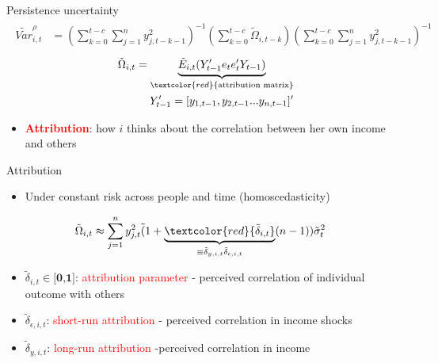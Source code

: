 \documentclass{beamer}
\begin{document}
\begin{frame}{Persistence uncertainty}
	\begin{eqnarray}
	\begin{split}
	\tilde {Var}^{\rho}_{i,t} & =   (\sum^{t-c}_{k=0}\sum^{n}_{j=1}y^2_{j,t-k-1})^{-1}(\sum^{t-c}_{k=0}\tilde \Omega_{i,t-k})(\sum^{t-c}_{k=0}\sum^{n}_{j=1}y^2_{j,t-k-1})^{-1}
	\end{split}
	\end{eqnarray}
	\begin{eqnarray}
	\begin{split}
	\tilde \Omega_{i,t} = \underbrace{\tilde E_{i,t}(Y'_{t-1}e_{t}e_{t}'Y_{t-1})}_{\textcolor{red}{\text{attribution matrix}}} \\
	Y'_{t-1} = [y_{1,t-1},y_{2,t-1}...y_{n,t-1}]'
	\end{split}
	\end{eqnarray}
	\begin{itemize}	  
		\item \textbf{\textcolor{red}{Attribution}}: how $i$ thinks about the correlation between her own income and others
	\end{itemize}
\end{frame}


\begin{frame}{Attribution}
	
	\begin{itemize}
		\item Under constant risk across people and time (homoscedasticity)
	\end{itemize}
	\begin{eqnarray}
	\begin{split}
	\tilde \Omega_{i,t}  & \approx \sum^{n}_{j=1}y^2_{j,t} \tilde (1+\underbrace{\textcolor{red}{\tilde \delta_{i,t}}}_{\equiv \tilde \delta_{y,i,t}\tilde \delta_{\epsilon,i,t}}(n-1)) \tilde \sigma^2_{t} 
	\end{split}
	\end{eqnarray}
	\begin{itemize}
			\item $\tilde \delta_{i,t} \in \textbf{[0,1]}$: \textcolor{red}{attribution parameter} - perceived correlation of individual outcome with others 
		\item $\tilde \delta_{\epsilon, i,t}$: \textcolor{red}{short-run attribution} -  perceived correlation in income shocks 
		\item $\tilde \delta_{y, i,t}$: \textcolor{red}{long-run attribution} -perceived correlation in income 
	
	\end{itemize}
\end{frame}
\end{document}
